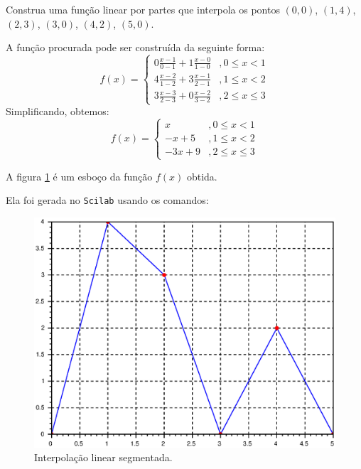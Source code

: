 \begin{ex}
  Construa uma função linear por partes que interpola os pontos $(0,0)$, $(1,4)$, $(2,3)$, $(3,0)$, $(4,2)$, $(5,0)$.

A função procurada pode ser construída da seguinte forma:
\begin{equation*}
  f(x) = \left\{
    \begin{array}{ll}
      0\frac{x-1}{0-1} + 1\frac{x-0}{1-0} &, 0 \leq x < 1\\
      4\frac{x-2}{1-2} + 3\frac{x-1}{2-1} &, 1\leq x < 2\\
      3\frac{x-3}{2-3} + 0\frac{x-2}{3-2} &, 2\leq x \leq 3
    \end{array}
\right.
\end{equation*}
Simplificando, obtemos:
\begin{equation*}
  f(x) = \left\{
    \begin{array}{ll}
      x &, 0 \leq x < 1\\
      -x + 5 &, 1\leq x < 2\\
      -3x + 9 &, 2\leq x \leq 3
    \end{array}
\right.  
\end{equation*}
\end{ex}

A figura \ref{fig:linear_segmentada} é um esboço da função $f(x)$ obtida. 

\ifisscilab
Ela foi gerada no \verb+Scilab+ usando os comandos:

\fi

\begin{figure}[htp]
  \begin{center}
    \includegraphics[scale=0.5]{./cap_interp/pics/interpolacao_linear_segmentada.eps}
    \caption{Interpolação linear segmentada.}
    \label{fig:linear_segmentada}
  \end{center}
\end{figure}



